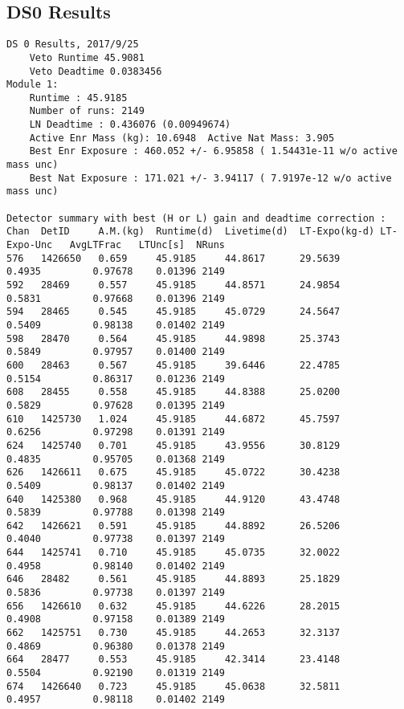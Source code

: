 \documentclass[notitlepage,rmp,aps,10pt]{revtex4-1}
\begin{document}
\subsection{DS0 Results}
\begin{verbatim}
DS 0 Results, 2017/9/25
	Veto Runtime 45.9081
	Veto Deadtime 0.0383456
Module 1:
	Runtime : 45.9185
	Number of runs: 2149
	LN Deadtime : 0.436076 (0.00949674)
	Active Enr Mass (kg): 10.6948  Active Nat Mass: 3.905
	Best Enr Exposure : 460.052 +/- 6.95858 ( 1.54431e-11 w/o active mass unc)
	Best Nat Exposure : 171.021 +/- 3.94117 ( 7.9197e-12 w/o active mass unc)

Detector summary with best (H or L) gain and deadtime correction :
Chan  DetID     A.M.(kg)  Runtime(d)  Livetime(d)  LT-Expo(kg-d) LT-Expo-Unc   AvgLTFrac   LTUnc[s]  NRuns
576   1426650   0.659     45.9185     44.8617      29.5639        0.4935         0.97678    0.01396 2149
592   28469     0.557     45.9185     44.8571      24.9854        0.5831         0.97668    0.01396 2149
594   28465     0.545     45.9185     45.0729      24.5647        0.5409         0.98138    0.01402 2149
598   28470     0.564     45.9185     44.9898      25.3743        0.5849         0.97957    0.01400 2149
600   28463     0.567     45.9185     39.6446      22.4785        0.5154         0.86317    0.01236 2149
608   28455     0.558     45.9185     44.8388      25.0200        0.5829         0.97628    0.01395 2149
610   1425730   1.024     45.9185     44.6872      45.7597        0.6256         0.97298    0.01391 2149
624   1425740   0.701     45.9185     43.9556      30.8129        0.4835         0.95705    0.01368 2149
626   1426611   0.675     45.9185     45.0722      30.4238        0.5409         0.98137    0.01402 2149
640   1425380   0.968     45.9185     44.9120      43.4748        0.5839         0.97788    0.01398 2149
642   1426621   0.591     45.9185     44.8892      26.5206        0.4040         0.97738    0.01397 2149
644   1425741   0.710     45.9185     45.0735      32.0022        0.4958         0.98140    0.01402 2149
646   28482     0.561     45.9185     44.8893      25.1829        0.5836         0.97738    0.01397 2149
656   1426610   0.632     45.9185     44.6226      28.2015        0.4908         0.97158    0.01389 2149
662   1425751   0.730     45.9185     44.2653      32.3137        0.4869         0.96380    0.01378 2149
664   28477     0.553     45.9185     42.3414      23.4148        0.5504         0.92190    0.01319 2149
674   1426640   0.723     45.9185     45.0638      32.5811        0.4957         0.98118    0.01402 2149

\end{verbatim}
\end{document}
